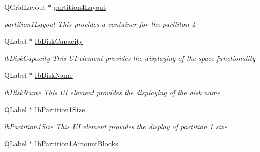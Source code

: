 \begin{DoxyCompactItemize}
\mbox{\label{classui_1_1window_1_1_disk_info_a7bf34bab44808bc3a025d7ff04f1131c}} 
Q\+Grid\+Layout $\ast$ \mbox{\hyperlink{classui_1_1window_1_1_disk_info_a7bf34bab44808bc3a025d7ff04f1131c}{partition4\+Layout}}
\begin{DoxyCompactList}\small\item\em partition1\+Layout This provides a container for the parititon 4 \end{DoxyCompactList}\item 
\mbox{\label{classui_1_1window_1_1_disk_info_af49e29a7007689ae42eb22e9e7d44d85}} 
Q\+Label $\ast$ \mbox{\hyperlink{classui_1_1window_1_1_disk_info_af49e29a7007689ae42eb22e9e7d44d85}{lb\+Disk\+Capacity}}
\begin{DoxyCompactList}\small\item\em lb\+Disk\+Capacity This UI element provides the displaying of the space functionality \end{DoxyCompactList}\item 
\mbox{\label{classui_1_1window_1_1_disk_info_a3512c625ec97e79a49976abc310ff812}} 
Q\+Label $\ast$ \mbox{\hyperlink{classui_1_1window_1_1_disk_info_a3512c625ec97e79a49976abc310ff812}{lb\+Disk\+Name}}
\begin{DoxyCompactList}\small\item\em lb\+Disk\+Name This UI element provides the displaying of the disk name \end{DoxyCompactList}\item 
\mbox{\label{classui_1_1window_1_1_disk_info_a67caeff64a4088f077001a83b4d24545}} 
Q\+Label $\ast$ \mbox{\hyperlink{classui_1_1window_1_1_disk_info_a67caeff64a4088f077001a83b4d24545}{lb\+Partition1\+Size}}
\begin{DoxyCompactList}\small\item\em lb\+Partition1\+Size This UI element provides the display of partition 1 size \end{DoxyCompactList}\item 
\mbox{\label{classui_1_1window_1_1_disk_info_ab4b828f288920d306d5e5502acd6234e}} 
Q\+Label $\ast$ \mbox{\hyperlink{classui_1_1window_1_1_disk_info_ab4b828f288920d306d5e5502acd6234e}{lb\+Partition1\+Amount\+Blocks}}

\end{DoxyCompactItemize}
